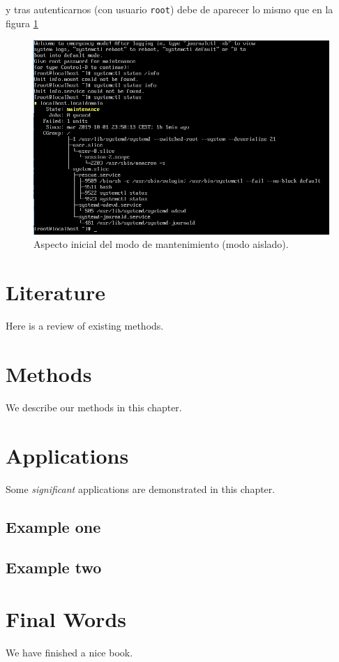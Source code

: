 \documentclass[
]{book}
\begin{document}
y tras autenticarnos (con usuario \texttt{root}) debe de aparecer lo mismo que en la figura \ref{fig:i}

\begin{figure}

{\centering \includegraphics[width=0.8\linewidth]{images/i} 

}

\caption{Aspecto inicial del modo de mantenimiento (modo aislado).}\label{fig:i}
\end{figure}

\hypertarget{literature}{%
\chapter{Literature}\label{literature}}

Here is a review of existing methods.

\hypertarget{methods}{%
\chapter{Methods}\label{methods}}

We describe our methods in this chapter.

\hypertarget{applications}{%
\chapter{Applications}\label{applications}}

Some \emph{significant} applications are demonstrated in this chapter.

\hypertarget{example-one}{%
\section{Example one}\label{example-one}}

\hypertarget{example-two}{%
\section{Example two}\label{example-two}}

\hypertarget{final-words}{%
\chapter{Final Words}\label{final-words}}

We have finished a nice book.

  
\end{document}

